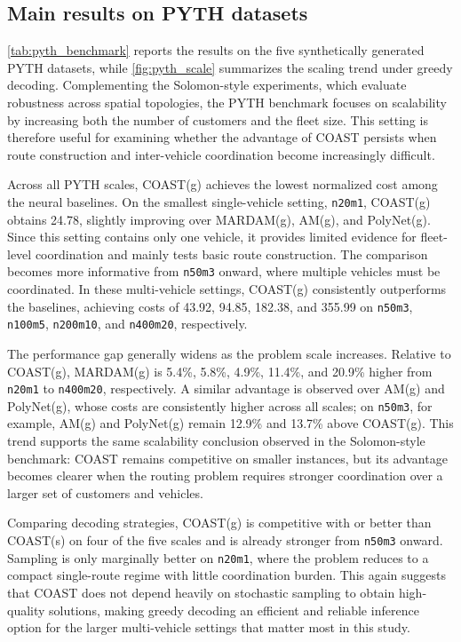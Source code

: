 \documentclass[conference]{IEEEtran}
\begin{document}
\subsection{Main results on PYTH datasets}

\autoref{tab:pyth_benchmark} reports the results on the five synthetically generated PYTH datasets, while \autoref{fig:pyth_scale} summarizes the scaling trend under greedy decoding. Complementing the Solomon-style experiments, which evaluate robustness across spatial topologies, the PYTH benchmark focuses on scalability by increasing both the number of customers and the fleet size. This setting is therefore useful for examining whether the advantage of COAST persists when route construction and inter-vehicle coordination become increasingly difficult.

Across all PYTH scales, COAST(g) achieves the lowest normalized cost among the neural baselines. On the smallest single-vehicle setting, \texttt{n20m1}, COAST(g) obtains 24.78, slightly improving over MARDAM(g), AM(g), and PolyNet(g). Since this setting contains only one vehicle, it provides limited evidence for fleet-level coordination and mainly tests basic route construction. The comparison becomes more informative from \texttt{n50m3} onward, where multiple vehicles must be coordinated. In these multi-vehicle settings, COAST(g) consistently outperforms the baselines, achieving costs of 43.92, 94.85, 182.38, and 355.99 on \texttt{n50m3}, \texttt{n100m5}, \texttt{n200m10}, and \texttt{n400m20}, respectively.

The performance gap generally widens as the problem scale increases. Relative to COAST(g), MARDAM(g) is 5.4\%, 5.8\%, 4.9\%, 11.4\%, and 20.9\% higher from \texttt{n20m1} to \texttt{n400m20}, respectively. A similar advantage is observed over AM(g) and PolyNet(g), whose costs are consistently higher across all scales; on \texttt{n50m3}, for example, AM(g) and PolyNet(g) remain 12.9\% and 13.7\% above COAST(g). This trend supports the same scalability conclusion observed in the Solomon-style benchmark: COAST remains competitive on smaller instances, but its advantage becomes clearer when the routing problem requires stronger coordination over a larger set of customers and vehicles.

Comparing decoding strategies, COAST(g) is competitive with or better than COAST(s) on four of the five scales and is already stronger from \texttt{n50m3} onward. Sampling is only marginally better on \texttt{n20m1}, where the problem reduces to a compact single-route regime with little coordination burden. This again suggests that COAST does not depend heavily on stochastic sampling to obtain high-quality solutions, making greedy decoding an efficient and reliable inference option for the larger multi-vehicle settings that matter most in this study.
\end{document}
